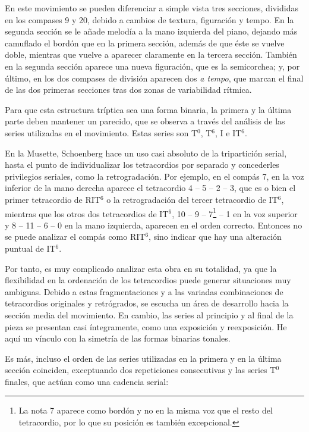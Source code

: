 		En este movimiento se pueden diferenciar a simple vista tres secciones, divididas en los compases 9 y 20, debido a cambios de textura, figuraci\'on y tempo. En la segunda secci\'on se le a\~nade melod\'ia a la mano izquierda del piano, dejando m\'as camuflado el bord\'on que en la primera secci\'on, adem\'as de que \'este se vuelve doble, mientras que vuelve a aparecer claramente en la tercera secci\'on. Tambi\'en en la segunda secci\'on aparece una nueva figuraci\'on, que es la semicorchea; y, por \'ultimo, en los dos compases de divisi\'on aparecen dos \emph{a tempo}, que marcan el final de las dos primeras secciones tras dos zonas de variabilidad r\'itmica. \cite{clercq}
		
		Para que esta estructura tr\'iptica sea una forma binaria, la primera y la \'ultima parte deben mantener un parecido, que se observa a trav\'es del an\'alisis de las series utilizadas en el movimiento. Estas series son T$^0$, T$^6$, I e IT$^6$.
		
		En la Musette, Schoenberg hace un uso casi absoluto de la tripartici\'on serial, hasta el punto de individualizar los tetracordios por separado y concederles privilegios seriales, como la retrogradaci\'on. Por ejemplo, en el comp\'as 7, en la voz inferior de la mano derecha aparece el tetracordio 4 -- 5 -- 2 -- 3, que es o bien el primer tetracordio de RIT$^6$ o la retrogradaci\'on del tercer tetracordio de IT$^6$, mientras que los otros dos tetracordios de IT$^6$, 10 -- 9 -- 7\footnote{La nota 7 aparece como bord\'on y no en la misma voz que el resto del tetracordio, por lo que su posici\'on es tambi\'en excepcional.} -- 1 en la voz superior y 8 -- 11 -- 6 -- 0 en la mano izquierda, aparecen en el orden correcto. Entonces no se puede analizar el comp\'as como RIT$^6$, sino indicar que hay una alteraci\'on puntual de IT$^6$.
		
		Por tanto, es muy complicado analizar esta obra en su totalidad, ya que la flexibilidad en la ordenaci\'on de los tetracordios puede generar situaciones muy ambiguas. Debido a estas fragmentaciones y a las variadas combinaciones de tetracordios originales y retr\'ogrados, se escucha un \'area de desarrollo hacia la secci\'on media del movimiento. En cambio, las series al principio y al final de la pieza se presentan casi \'integramente, como una exposici\'on y reexposici\'on. He aqu\'i un v\'inculo con la simetr\'ia de las formas binarias tonales. \cite{clercq}
		
		Es m\'as, incluso el orden de las series utilizadas en la primera y en la \'ultima secci\'on coinciden, exceptuando dos repeticiones consecutivas y las series T$^0$ finales, que act\'uan como una cadencia serial:
		
